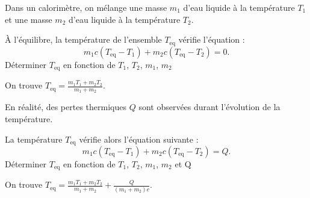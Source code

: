 \debutEntrainement

Dans un calorimètre, on mélange une masse $m_1$ d'eau liquide à la température $T_1$ et une masse $m_2$ d'eau liquide à la température $T_2$. 

\medskip




\begin{enonce}
À l'équilibre, la température de l'ensemble $T_{\text{eq}}$ vérifie l'équation :
\[
m_1 c (T_{\text{eq}} - T_1) + m_2 c (T_{\text{eq}} - T_2) = 0.
\]
Déterminer $T_{\text{eq}}$ en fonction de $T_1$, $T_2$, $m_1$, $m_2$
\end{enonce}


\begin{corrige}
On trouve  $T_{\text{eq}} = \frac {m_1 T_{1}+m_2 T_{2}}{m_1+m_2}$.
\end{corrige}






\begin{enonce}
	En réalité, des pertes thermiques $Q$ sont observées durant l'évolution de la température. 
	
	La température $T_{ \text{eq}}$ vérifie alors l'équation suivante :
	\[
	m_1 c (T_{ \text{eq} } - T_1) + m_2 c (T_{\text{eq}} - T_2) = Q.
	\]
Déterminer $T_{\text{eq}}$ en fonction de $T_1$, $T_2$, $m_1$, $m_2$ et Q
\end{enonce}

\begin{corrige}
On trouve $T_{\text{eq}} = \frac {m_1 T_{1}+m_2 T_{2}}{m_1+m_2} + \frac {Q}{(m_1+m_2)c}$.
\end{corrige}





\finEntrainement









